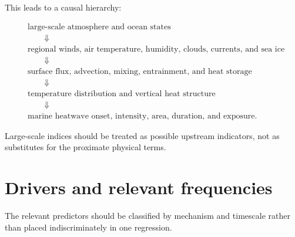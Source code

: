 \documentclass[11pt]{article}
\newcommand{\MHW}{marine heatwave}
\begin{document}
This leads to a causal hierarchy:

\begin{align*}
&\text{large-scale atmosphere and ocean states}\\
&\qquad\Downarrow\\
&\text{regional winds, air temperature, humidity, clouds, currents, and sea ice}\\
&\qquad\Downarrow\\
&\text{surface flux, advection, mixing, entrainment, and heat storage}\\
&\qquad\Downarrow\\
&\text{temperature distribution and vertical heat structure}\\
&\qquad\Downarrow\\
&\text{\MHW{} onset, intensity, area, duration, and exposure}.
\end{align*}

Large-scale indices should be treated as possible upstream indicators, not as substitutes for the proximate physical terms.

\section{Drivers and relevant frequencies}

The relevant predictors should be classified by mechanism and timescale rather than placed indiscriminately in one regression.
\end{document}
